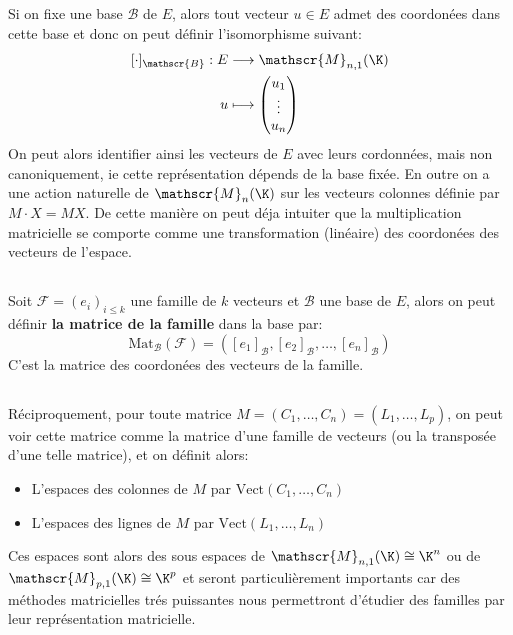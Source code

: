 \subsection*{}
Si on fixe une base \( \mathscr{B} \) de \( E \), alors tout vecteur \( u \in E \) admet des coordonées dans cette base et donc on peut définir l'isomorphisme suivant:
\[ 
   \begin{aligned}
      [ \cdot ]_{ \mathscr{B}} : E &\longrightarrow \mathscr{M}_{n, 1}( \K) \\
      u &\longmapsto \begin{pmatrix}
      u_1\\
      \vdots\\
      u_n
      \end{pmatrix} 
   \end{aligned} 
\]
On peut alors identifier ainsi les vecteurs de \( E \) avec leurs cordonnées, mais non canoniquement, ie cette représentation dépends de la base fixée. En outre on a une action naturelle de \( \mathscr{M}_n( \K) \) sur les vecteurs colonnes définie par \( M \cdot X = MX \). De cette manière on peut déja intuiter que la multiplication matricielle se comporte comme une transformation (linéaire) des coordonées des vecteurs de l'espace.
\subsection*{}

Soit \(\mathscr{F} = (e_i)_{i \leq k}\) une famille de \( k \) vecteurs et \( \mathscr{B} \) une base de \( E \), alors on peut définir \textbf{la matrice de la famille} dans la base par:
\[
   \text{Mat}_{\mathscr{B}}(\mathscr{F}) = \left([e_1]_{\mathscr{B}}, [e_2]_{\mathscr{B}}, \ldots, [e_n]_{\mathscr{B}} \right)  
\]
C'est la matrice des coordonées des vecteurs de la famille. 
\subsection*{}
Réciproquement, pour toute matrice \( M = (C_1, \ldots, C_n) = (L_1, \ldots, L_p)\), on peut voir cette matrice comme la matrice d'une famille de vecteurs (ou la transposée d'une telle matrice), et on définit alors:
\begin{itemize}
   \item L'espaces des colonnes de \( M \) par \( \text{Vect}(C_1, \ldots, C_n) \)
   \item L'espaces des lignes de \( M \) par \( \text{Vect}(L_1, \ldots, L_n) \)
\end{itemize}
Ces espaces sont alors des sous espaces de \(\mathscr{M}_{n, 1}( \K) \cong \K^n \) ou de \(\mathscr{M}_{p, 1}( \K) \cong \K^p\) et seront particulièrement importants car des méthodes matricielles trés puissantes nous permettront d'étudier des familles par leur représentation matricielle.
\pagebreak
